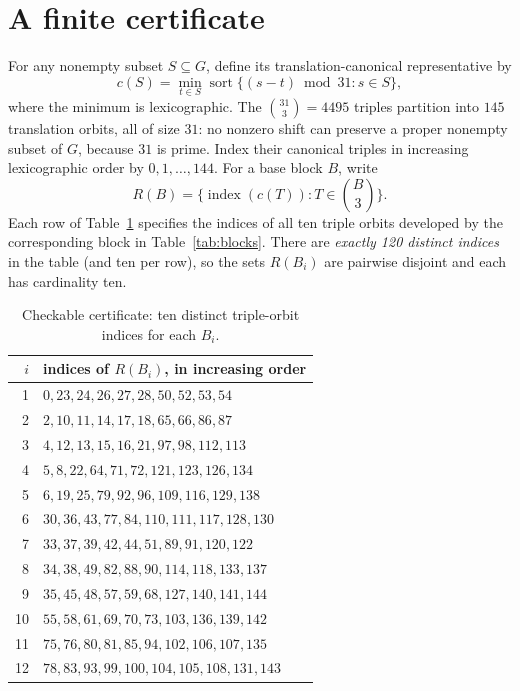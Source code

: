 \documentclass[11pt,a4paper]{article}
\begin{document}
\section{A finite certificate}
For any nonempty subset $S\subseteq G$, define its translation-canonical
representative by
\[
 c(S)=\min_{t\in S}\operatorname{sort}\{(s-t)\bmod31:s\in S\},
\]
where the minimum is lexicographic. The $\binom{31}{3}=4495$ triples
partition into $145$ translation orbits, all of size $31$: no nonzero
shift can preserve a proper nonempty subset of $G$, because $31$ is prime.
Index their canonical triples in increasing lexicographic order by
$0,1,\ldots,144$. For a base block $B$, write
\[
 R(B)=\{\operatorname{index}(c(T)):T\in\textstyle{\binom B3}\}.
\]
Each row of Table~\ref{tab:certificate} specifies the indices of all ten
triple orbits developed by the corresponding block in
Table~\ref{tab:blocks}. There are \emph{exactly 120 distinct indices}
in the table (and ten per row), so the sets $R(B_i)$ are pairwise disjoint
and each has cardinality ten.

\begin{table}[ht]
\centering
\caption{Checkable certificate: ten distinct triple-orbit indices for each $B_i$.}
\label{tab:certificate}
\small
\renewcommand{\arraystretch}{1.10}
\begin{tabular}{r l}
\toprule
$i$ & indices of $R(B_i)$, in increasing order\\
\midrule
 1 & $ 0,23,24,26,27,28,50,52,53,54$\\
 2 & $ 2,10,11,14,17,18,65,66,86,87$\\
 3 & $ 4,12,13,15,16,21,97,98,112,113$\\
 4 & $ 5,8,22,64,71,72,121,123,126,134$\\
 5 & $ 6,19,25,79,92,96,109,116,129,138$\\
 6 & $30,36,43,77,84,110,111,117,128,130$\\
 7 & $33,37,39,42,44,51,89,91,120,122$\\
 8 & $34,38,49,82,88,90,114,118,133,137$\\
 9 & $35,45,48,57,59,68,127,140,141,144$\\
10 & $55,58,61,69,70,73,103,136,139,142$\\
11 & $75,76,80,81,85,94,102,106,107,135$\\
12 & $78,83,93,99,100,104,105,108,131,143$\\
\bottomrule
\end{tabular}
\end{table}
\end{document}
